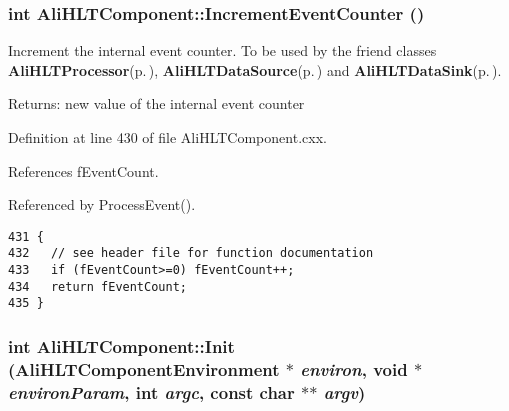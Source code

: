 \subsubsection{\setlength{\rightskip}{0pt plus 5cm}int Ali\-HLTComponent::Increment\-Event\-Counter ()\hspace{0.3cm}{\tt  [private]}}\label{classAliHLTComponent_d0}


Increment the internal event counter. To be used by the friend classes {\bf Ali\-HLTProcessor}{\rm (p.\,\pageref{classAliHLTProcessor})}, {\bf Ali\-HLTData\-Source}{\rm (p.\,\pageref{classAliHLTDataSource})} and {\bf Ali\-HLTData\-Sink}{\rm (p.\,\pageref{classAliHLTDataSink})}. \begin{Desc}
\item[Returns:]new value of the internal event counter \end{Desc}


Definition at line 430 of file Ali\-HLTComponent.cxx.

References f\-Event\-Count.

Referenced by Process\-Event().

\footnotesize\begin{verbatim}431 {
432   // see header file for function documentation
433   if (fEventCount>=0) fEventCount++;
434   return fEventCount;
435 }
\end{verbatim}\normalsize 


\subsubsection{\setlength{\rightskip}{0pt plus 5cm}int Ali\-HLTComponent::Init ({\bf Ali\-HLTComponent\-Environment} $\ast$ {\em environ}, void $\ast$ {\em environ\-Param}, int {\em argc}, const char $\ast$$\ast$ {\em argv})\hspace{0.3cm}{\tt  [virtual]}}\label{classAliHLTComponent_a4}


